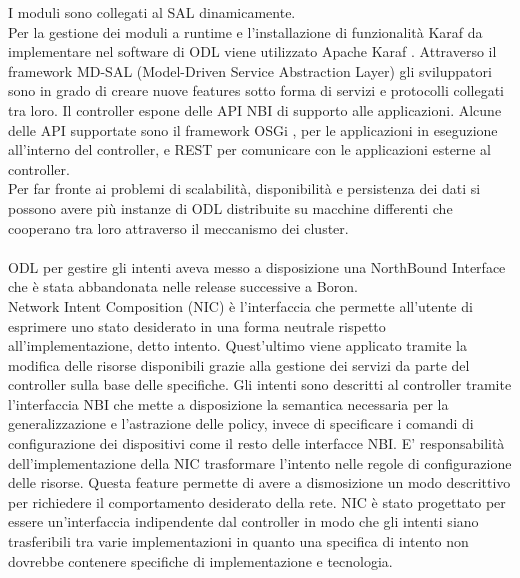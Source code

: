I moduli sono collegati al SAL dinamicamente.
\\Per la gestione dei moduli a runtime e l'installazione di funzionalità Karaf da implementare nel software di ODL viene utilizzato Apache Karaf \cite{Apache}.
Attraverso il framework MD-SAL (Model-Driven Service Abstraction Layer) gli sviluppatori sono in grado di creare nuove features sotto forma di servizi e protocolli collegati tra loro.
Il controller espone delle API NBI di supporto alle applicazioni. Alcune delle API supportate sono il framework OSGi \cite{osgi}, per le applicazioni in eseguzione all'interno del controller,
e REST per comunicare con le applicazioni esterne al controller.
\\Per far fronte ai problemi di scalabilità, disponibilità e persistenza dei dati si possono avere più instanze di ODL distribuite su macchine differenti che cooperano tra loro attraverso il meccanismo dei cluster.
\\
\\ODL per gestire gli intenti aveva messo a disposizione una NorthBound Interface che è stata abbandonata nelle release successive a Boron.
\\Network Intent Composition (NIC) \cite{nic} è l'interfaccia che permette all'utente di esprimere uno stato desiderato in una forma neutrale rispetto all'implementazione, detto intento. Quest'ultimo viene applicato tramite la modifica delle risorse disponibili 
grazie alla gestione dei servizi da parte del controller sulla base delle specifiche.
Gli intenti sono descritti al controller tramite l'interfaccia NBI che mette a disposizione la semantica necessaria per la generalizzazione e l'astrazione delle policy, invece di specificare i comandi di configurazione dei dispositivi come il resto delle interfacce NBI.
E' responsabilità dell'implementazione della NIC trasformare l'intento nelle regole di configurazione delle risorse.
Questa feature permette di avere a dismosizione un modo descrittivo per richiedere il comportamento desiderato della rete.
NIC è stato progettato per essere un'interfaccia indipendente dal controller in modo che gli intenti siano trasferibili tra varie implementazioni in quanto una specifica di intento non dovrebbe contenere specifiche di implementazione e tecnologia.



